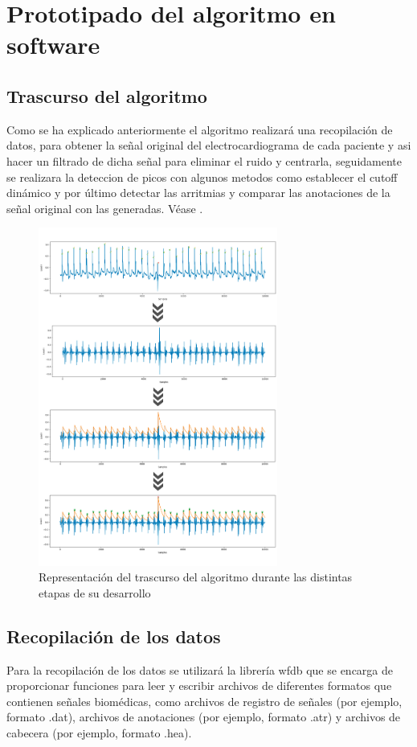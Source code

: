 \chapter{Prototipado del algoritmo en software}

\section{Trascurso del algoritmo}
Como se ha explicado anteriormente el algoritmo realizará una recopilación de datos, para obtener 
la señal original del electrocardiograma de cada paciente y asi hacer un filtrado de dicha señal para eliminar
 el ruido y centrarla, seguidamente se realizara la deteccion de picos con algunos metodos como establecer 
 el cutoff dinámico y por último detectar las arritmias y comparar las anotaciones de la señal original con las generadas.
 Véase
  .

\begin{figure}[h!]
    \centering
    \includegraphics[width=0.7\textwidth]{./Images/img_algoritmo/esquemaGeneral.jpg}
    \caption[Representación del trascurso del prototipo]{Representación del trascurso del algoritmo durante las distintas etapas de su desarrollo}
    \label{fig:esquemaGeneral}
\end{figure}

\section{Recopilación de los datos}
Para la recopilación de los datos se utilizará la librería wfdb que se encarga de proporcionar
funciones para leer y escribir archivos de diferentes formatos que contienen señales biomédicas,
como archivos de registro de señales (por ejemplo, formato .dat), archivos de anotaciones
(por ejemplo, formato .atr) y archivos de cabecera (por ejemplo, formato .hea).

